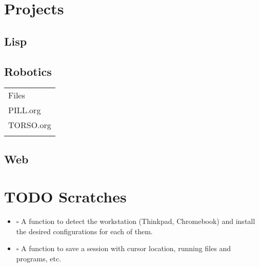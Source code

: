 \documentclass[11pt]{article}
\begin{document}
\section{Projects}
\label{sec-2}

\subsection{Lisp}
\label{sec-2-1}

\subsection{Robotics}
\label{sec-2-2}

\begin{center}
\begin{tabular}{l}
Files\\
PILL.org\\
TORSO.org\\
\\
\end{tabular}
\end{center}

\subsection{Web}
\label{sec-2-3}


\section{{\bfseries\sffamily TODO} Scratches}
\label{sec-3}

\begin{itemize}
\item $\square$ A function to detect the workstation (Thinkpad, Chromebook) and install the desired configurations for each of them.
\item $\square$ A function to save a session with cursor location, running files and programs, etc.
\end{itemize}
\end{document}
